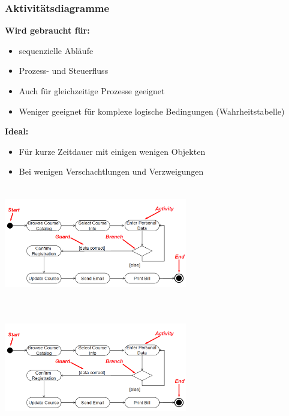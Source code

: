 \subsubsection{Aktivitätsdiagramme }

\begin{multicols}{2}
	\textbf{Wird gebraucht für:}
	\begin{itemize}
		\item sequenzielle Abläufe
		\item Prozess- und Steuerfluss
		\item Auch für gleichzeitige Prozesse geeignet
		\item Weniger geeignet für komplexe logische Bedingungen (Wahrheitstabelle)
	\end{itemize}
	\columnbreak
	
	\textbf{Ideal:}
	\begin{itemize}
		\item Für kurze Zeitdauer mit einigen wenigen Objekten
		\item Bei wenigen Verschachtlungen und Verzweigungen
	\end{itemize}
\end{multicols}

\begin{minipage}[hbt]{1cm}
	\centering
	\includegraphics[height=5cm, width = 8cm,]{images/Modellierung/Aktivitaetsdiagramm1}
	\label{Bild3}
\end{minipage}
\hfill
\begin{minipage}[hbt]{8cm}
	\centering
	\includegraphics[height=5cm, width = 8cm,]{images/Modellierung/Aktivitaetsdiagramm1}
	\label{Bild4}
\end{minipage}




